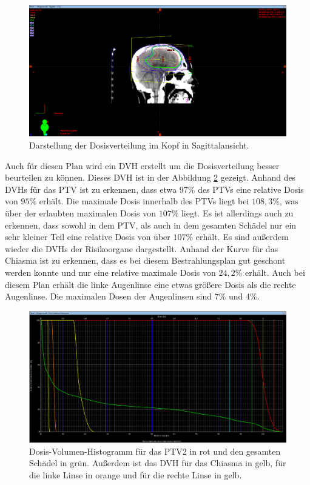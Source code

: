 \begin{figure}[H]
  \centering
  \includegraphics[width=\textwidth]{Bilder/Teilhirn2_X.png}
  \caption{Darstellung der Dosisverteilung im Kopf in Sagittalansicht.}
  \label{abb:X2}
\end{figure}

Auch für diesen Plan wird ein DVH erstellt um die Dosisverteilung besser beurteilen zu können.
Dieses DVH ist in der Abbildung \ref{abb:DVH2} gezeigt. Anhand des DVHs für das PTV ist zu erkennen, dass
etwa $97\%$ des PTVs eine relative Dosis von $95\%$ erhält. Die maximale Dosis innerhalb des PTVs liegt bei $108,3\%$, was über der erlaubten
maximalen Dosis von $107\%$ liegt. Es ist allerdings auch zu erkennen, dass sowohl in dem PTV, als auch in dem gesamten Schädel nur ein sehr kleiner
Teil eine relative Dosis von über $107\%$ erhält. Es sind außerdem wieder die DVHs der Risikoorgane dargestellt.
Anhand der Kurve für das Chiasma ist zu erkennen, dass es bei diesem Bestrahlungsplan gut geschont werden konnte und nur eine relative maximale
Dosis von $24,2\%$ erhält. Auch bei diesem Plan erhält die linke Augenlinse eine etwas größere Dosis als die rechte Augenlinse. Die maximalen Dosen
der Augenlinsen sind $7\%$ und $4\%$.

\begin{figure}[H]
  \centering
  \includegraphics[width=\textwidth]{Bilder/Teilhirn2_DVH.png}
  \caption{Dosis-Volumen-Histogramm für das PTV2 in rot und den gesamten Schädel in grün. Außerdem ist das DVH für das Chiasma in gelb, für die linke Linse in orange und für die rechte Linse in gelb.}
  \label{abb:DVH2}
\end{figure}


